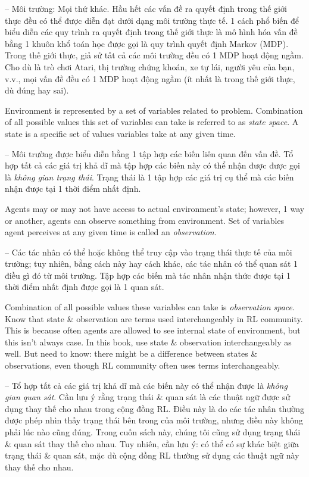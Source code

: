 \documentclass{article}
\begin{document}
\begin{itemize}
\begin{itemize}
\begin{itemize}
            -- {\sf Môi trường: Mọi thứ khác.} Hầu hết các vấn đề ra quyết định trong thế giới thực đều có thể được diễn đạt dưới dạng môi trường thực tế. 1 cách phổ biến để biểu diễn các quy trình ra quyết định trong thế giới thực là mô hình hóa vấn đề bằng 1 khuôn khổ toán học được gọi là quy trình quyết định Markov (MDP). Trong thế giới thực, giả sử tất cả các môi trường đều có 1 MDP hoạt động ngầm. Cho dù là trò chơi Atari, thị trường chứng khoán, xe tự lái, người yêu của bạn, v.v., mọi vấn đề đều có 1 MDP hoạt động ngầm (ít nhất là trong thế giới thực, dù đúng hay sai).

            Environment is represented by a set of variables related to problem. Combination of all possible values this set of variables can take is referred to as {\it state space}. A state is a specific set of values variables take at any given time.

            -- Môi trường được biểu diễn bằng 1 tập hợp các biến liên quan đến vấn đề. Tổ hợp tất cả các giá trị khả dĩ mà tập hợp các biến này có thể nhận được được gọi là {\it không gian trạng thái}. Trạng thái là 1 tập hợp các giá trị cụ thể mà các biến nhận được tại 1 thời điểm nhất định.

            Agents may or may not have access to actual environment's state; however, 1 way or another, agents can observe something from environment. Set of variables agent perceives at any given time is called an {\it observation}.

            -- Các tác nhân có thể hoặc không thể truy cập vào trạng thái thực tế của môi trường; tuy nhiên, bằng cách này hay cách khác, các tác nhân có thể quan sát 1 điều gì đó từ môi trường. Tập hợp các biến mà tác nhân nhận thức được tại 1 thời điểm nhất định được gọi là 1 quan sát.

            Combination of all possible values these variables can take is {\it observation space}. Know that state \& observation are terms used interchangeably in RL community. This is because often agents are allowed to see internal state of environment, but this isn't always case. In this book, use state \& observation interchangeably as well. But need to know: there might be a difference between states \& observations, even though RL community often uses terms interchangeably.

            -- Tổ hợp tất cả các giá trị khả dĩ mà các biến này có thể nhận được là {\it không gian quan sát}. Cần lưu ý rằng trạng thái \& quan sát là các thuật ngữ được sử dụng thay thế cho nhau trong cộng đồng RL. Điều này là do các tác nhân thường được phép nhìn thấy trạng thái bên trong của môi trường, nhưng điều này không phải lúc nào cũng đúng. Trong cuốn sách này, chúng tôi cũng sử dụng trạng thái \& quan sát thay thế cho nhau. Tuy nhiên, cần lưu ý: có thể có sự khác biệt giữa trạng thái \& quan sát, mặc dù cộng đồng RL thường sử dụng các thuật ngữ này thay thế cho nhau.


\end{itemize}
\end{itemize}
\end{itemize}
\end{document}
